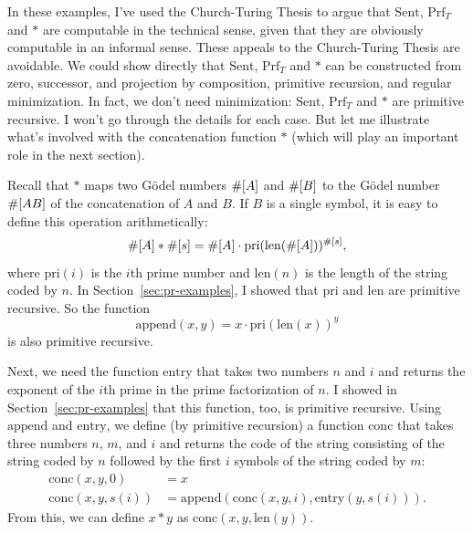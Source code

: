 In these examples,
I've used the Church-Turing Thesis to argue
that $\mathrm{Sent}$, $\mathrm{Prf}_T$ and $*$ are computable in the technical sense,
given that they are obviously computable in an informal sense.
These appeals to the Church-Turing Thesis are avoidable.
We could show directly that $\mathrm{Sent}$, $\mathrm{Prf}_T$ and $*$ can be constructed
from zero, successor, and projection
by composition, primitive recursion, and regular minimization.
In fact,
we don't need minimization:
$\mathrm{Sent}$, $\mathrm{Prf}_T$ and $*$ are primitive recursive.
I won't go through the details for each case.
But let me illustrate what's involved
with the concatenation function $*$
(which will play an important role in the next section).

Recall that $*$ maps two Gödel numbers $\#[A]$ and $\#[B]$
to the Gödel number $\#[AB]$ of the concatenation of $A$ and $B$.
If $B$ is a single symbol,
it is easy to define this operation arithmetically:
\[
  \#[A] * \#[s] = \#[A] \cdot \mathrm{pri}(\mathrm{len}(\#[A]))^{\#[s]},
\]
where $\mathrm{pri}(i)$ is the $i$th prime number and
$\mathrm{len}(n)$ is the length of the string coded by $n$.
In Section~\ref{sec:pr-examples},
I showed that $\mathrm{pri}$ and $\mathrm{len}$ are primitive recursive.
So the function
\[
  \mathrm{append}(x,y) = x \cdot \mathrm{pri}(\mathrm{len}(x))^{y}
\]
is also primitive recursive.

Next,
we need the function $\mathrm{entry}$ that takes two numbers $n$ and $i$
and returns the exponent of the $i$th prime in the prime factorization of $n$.
I showed in Section~\ref{sec:pr-examples} that
this function, too, is primitive recursive.
Using $\mathrm{append}$ and $\mathrm{entry}$,
we define (by primitive recursion)
a function $\mathrm{conc}$ that
takes three numbers $n$, $m$, and $i$
and returns the code of the string consisting of the string coded by $n$ followed by the first $i$ symbols of the string coded by $m$:
\begin{align*}
  \mathrm{conc}(x, y, 0) & = x \\
  \mathrm{conc}(x, y, s(i)) & = \mathrm{append}(\mathrm{conc}(x, y, i), \mathrm{entry}(y, s(i))).
\end{align*}
From this,
we can define $x*y$ as $\mathrm{conc}(x,y,\mathrm{len}(y))$.



